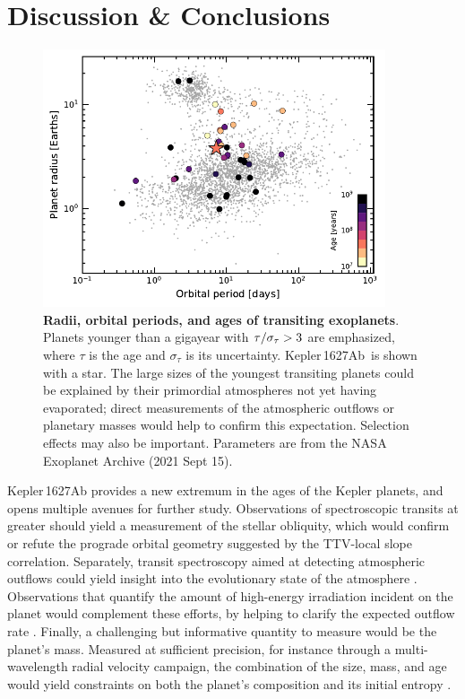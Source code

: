 \documentclass[12pt,modern,twocolumn,tighten]{aastex63}
\newcommand{\pn}{Kepler\,1627Ab} %
\begin{document}
\section{Discussion \& Conclusions}
\label{sec:conc}

\begin{figure}[!t]
	\begin{center}
		\leavevmode
		\includegraphics[width=0.9\textwidth]{f8.pdf}
	\end{center}
	\vspace{-0.7cm}
	\caption{
		{\bf Radii, orbital periods, and ages of transiting exoplanets}.
		Planets younger than a gigayear with ${\rm \tau}/\sigma_{\tau} >
		3$ are emphasized, where $\tau$ is the age and $\sigma_{\tau}$ is
		its uncertainty.  \pn\ is shown with a star.  The large sizes of
		the youngest transiting planets could be explained by their
		primordial atmospheres not yet having evaporated; direct
		measurements of the atmospheric outflows or planetary masses would
		help to confirm this expectation.  Selection effects may also be
		important.  Parameters are from the NASA Exoplanet Archive (2021
		Sept 15).
		\label{fig:rp_period_age}
	}
\end{figure}

Kepler\,1627Ab provides a new extremum in the ages of the Kepler
planets, and opens multiple avenues for further study.  Observations
of spectroscopic transits at greater
 should yield a
measurement of the stellar obliquity, which would confirm or refute
the prograde orbital geometry suggested by the TTV-local slope
correlation.  Separately, transit spectroscopy aimed at detecting
atmospheric outflows could yield insight into the evolutionary state
of the atmosphere \citep[{\it
e.g.},][]{ehrenreich_giant_2015,spake_helium_2018,vissapragada_2020}.
Observations that quantify the amount of high-energy
irradiation incident on the planet would complement these efforts, by
helping to clarify the expected outflow rate \citep[{\it
e.g.},][]{poppenhaeger_2021}.  Finally, a challenging but informative
quantity to measure would be the planet's mass.  Measured at
sufficient precision,
for instance through a multi-wavelength radial velocity campaign,
the combination of the size, mass, and age 
would yield constraints on both the planet's composition and its
initial entropy \citep{owen_constraining_2020}.
\end{document}
